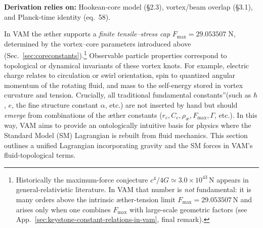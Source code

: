 \begin{center}
    \footnotesize
    \textbf{Derivation relies on:} Hookean‐core model (§2.3), vortex/beam overlap (§3.1), and Planck-time identity (eq.~58).
\end{center}

In VAM the æther supports a \emph{finite tensile--stress cap}  \(F_{\max}=29.053507\;\text{N}\), determined by the vortex--core parameters introduced above (Sec.~\ref{sec:coreconstants}).\footnote{Historically the maximum-force conjecture $c^{4}/4G\simeq3.0\times10^{43}$\,N appears in general-relativistic literature.  In VAM that number is \emph{not} fundamental: it is many orders above the intrinsic æther-tension limit \(F_{\max}=29.053507\)\,N and arises only when one combines $F_{\max}$ with large-scale geometric factors (see App.~\ref{sec:keystone-constant-relations-in-vam}, final remark).
}
Observable particle properties correspond to topological or dynamical invariants of these vortex knots. For example, electric charge relates to circulation or swirl orientation, spin to quantized angular momentum of the rotating fluid, and mass to the self-energy stored in vortex curvature and tension. Crucially, all traditional \grqq fundamental constants\textquotedblright (such as $\hbar$, $e$, the fine structure constant $\alpha$, etc.) are not inserted by hand but should \textit{emerge} from combinations of the æther constants ($r_c, C_e, \rho_{\text{\ae}}, F_{\max}, \Gamma$, etc.). In this way, VAM aims to provide an ontologically intuitive basis for physics where the Standard Model (SM) Lagrangian is rebuilt from fluid mechanics. This section outlines a unified Lagrangian incorporating gravity and the SM forces in VAM's fluid-topological terms.
